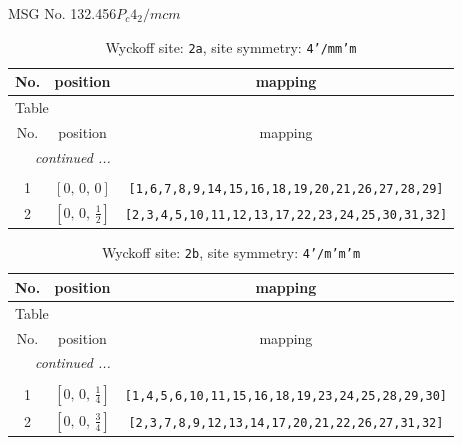 \documentclass[fleqn,8pt]{jsarticle}
\begin{document}
\setcounter{MaxMatrixCols}{32}

\renewcommand{\tablename}{Table~}
\renewcommand{\figurename}{Figure~}
\begin{center}
\LARGE
MSG No. 132.456\quad$P_{c}4_{2}/mcm$
\end{center}
\renewcommand{\arraystretch}{1.2}
\begin{longtable}{ccc}
\caption{Wyckoff site: {\tt 2a}, site symmetry: {\tt 4'/mm'm}}
 \\
 \hline \hline
No. & position & mapping \\ \hline \endfirsthead

\multicolumn{2}{l}{\tablename\ \thetable{}} \\
 \hline \hline
No. & position & mapping \\ \hline \endhead

 \hline \hline
\multicolumn{2}{r}{\footnotesize\it continued ...} \\ \endfoot

 \hline \hline
\multicolumn{2}{r}{} \\ \endlastfoot

1 & $\left[ 0,\, 0,\, 0 \right]$ & {\tt [1,6,7,8,9,14,15,16,18,19,20,21,26,27,28,29]} \\ \hline
2 & $\left[ 0,\, 0,\, \frac{1}{2} \right]$ & {\tt [2,3,4,5,10,11,12,13,17,22,23,24,25,30,31,32]} \\
\end{longtable}
\renewcommand{\arraystretch}{1.2}
\begin{longtable}{ccc}
\caption{Wyckoff site: {\tt 2b}, site symmetry: {\tt 4'/m'm'm}}
 \\
 \hline \hline
No. & position & mapping \\ \hline \endfirsthead

\multicolumn{2}{l}{\tablename\ \thetable{}} \\
 \hline \hline
No. & position & mapping \\ \hline \endhead

 \hline \hline
\multicolumn{2}{r}{\footnotesize\it continued ...} \\ \endfoot

 \hline \hline
\multicolumn{2}{r}{} \\ \endlastfoot

1 & $\left[ 0,\, 0,\, \frac{1}{4} \right]$ & {\tt [1,4,5,6,10,11,15,16,18,19,23,24,25,28,29,30]} \\ \hline
2 & $\left[ 0,\, 0,\, \frac{3}{4} \right]$ & {\tt [2,3,7,8,9,12,13,14,17,20,21,22,26,27,31,32]} \\
\end{longtable}
\end{document}
